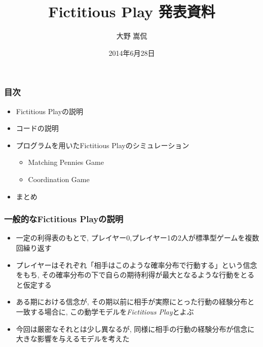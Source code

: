 \documentclass[dvipdfmx,fleqn,handout]{beamer}
\title{\Large Fictitious Play 発表資料}
\author{\large 大野 嵩侃}
\date{\small 2014年6月28日}
\begin{document}
\sffamily
\gtfamily


\begin{frame}
  \titlepage
  \thispagestyle{empty}
\end{frame}

\setcounter{framenumber}{0}




\begin{frame}
\frametitle{目次}
\begin{itemize}\setlength{\parskip}{0.5em}
\item
Fictitious Playの説明
\item
コードの説明
\item
プログラムを用いたFictitious Playのシミュレーション 
\begin{itemize}\setlength{\parskip}{0.5em}
 \item
 Matching Pennies Game
 \item
 Coordination Game
 \end{itemize}
\item
まとめ
\end{itemize}
\end{frame}



\begin{frame}
\frametitle{一般的なFictitious Playの説明}
\begin{itemize}\setlength{\parskip}{0.5em}
\item
一定の利得表のもとで, プレイヤー0,プレイヤー1の2人が標準型ゲームを複数回繰り返す\pause
\item
プレイヤーはそれぞれ「相手はこのような確率分布で行動する」という信念をもち, その確率分布の下で自らの期待利得が最大となるような行動をとると仮定する\pause
\item
ある期における信念が, その期以前に相手が実際にとった行動の経験分布と一致する場合に, この動学モデルを\emph{Fictitious Play}とよぶ\pause
\item
今回は厳密なそれとは少し異なるが, 同様に相手の行動の経験分布が信念に大きな影響を与えるモデルを考えた
\end{itemize}
\end{frame}
\end{document}
